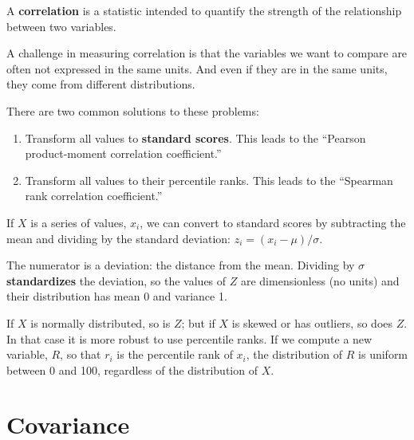 \documentclass[12pt]{book}
\begin{document}
A {\bf correlation} is a statistic intended to quantify the strength
of the relationship between two variables.

A challenge in measuring correlation is that the variables we want to
compare are often not expressed in the same units.  And even if they
are in the same units, they come from different distributions.

There are two common solutions to these problems:

\begin{enumerate}

\item Transform all values to {\bf standard scores}.  This leads to
the ``Pearson product-moment correlation coefficient.''

\item Transform all values to their percentile ranks.  This
leads to the ``Spearman rank correlation coefficient.''

\end{enumerate}

If $X$ is a series of values, $x_i$, we can convert to standard
scores by subtracting the mean and dividing by the standard deviation:
$z_i = (x_i - \mu) / \sigma$.

The numerator is a deviation: the distance from the mean.  Dividing by
$\sigma$ {\bf standardizes} the deviation, so the values of $Z$ are
dimensionless (no units) and their distribution has mean 0 and
variance 1.

If $X$ is normally distributed, so is $Z$; but if $X$ is skewed or has
outliers, so does $Z$.  In that case it is more robust to use
percentile ranks.  If we compute a new variable, $R$, so that $r_i$ is
the percentile rank of $x_i$, the distribution of $R$ is uniform
between 0 and 100, regardless of the distribution of $X$.
 


\section{Covariance}
\end{document}
